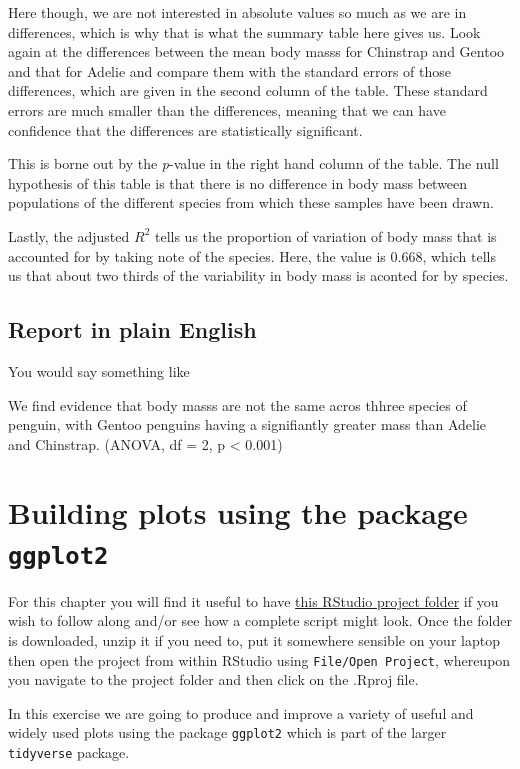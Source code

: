 \documentclass[
  letterpaper,
  DIV=11,
  numbers=noendperiod]{scrreprt}
\begin{document}
Here though, we are not interested in absolute values so much as we are
in differences, which is why that is what the summary table here gives
us. Look again at the differences between the mean body masss for
Chinstrap and Gentoo and that for Adelie and compare them with the
standard errors of those differences, which are given in the second
column of the table. These standard errors are much smaller than the
differences, meaning that we can have confidence that the differences
are statistically significant.

This is borne out by the \emph{p}-value in the right hand column of the
table. The null hypothesis of this table is that there is no difference
in body mass between populations of the different species from which
these samples have been drawn.

Lastly, the adjusted \(R^2\) tells us the proportion of variation of
body mass that is accounted for by taking note of the species. Here, the
value is 0.668, which tells us that about two thirds of the variability
in body mass is aconted for by species.

\section{Report in plain English}\label{report-in-plain-english}

You would say something like

We find evidence that body masss are not the same acros thhree species
of penguin, with Gentoo penguins having a signifiantly greater mass than
Adelie and Chinstrap. (ANOVA, df = 2, p \textless{} 0.001)

\chapter{\texorpdfstring{Building plots using the package
\texttt{ggplot2}}{Building plots using the package ggplot2}}\label{building-plots-using-the-package-ggplot2}

For this chapter you will find it useful to have
\href{https://github.com/mbh038/ggplot2/archive/refs/heads/main.zip}{this
RStudio project folder} if you wish to follow along and/or see how a
complete script might look. Once the folder is downloaded, unzip it if
you need to, put it somewhere sensible on your laptop then open the
project from within RStudio using \texttt{File/Open\ Project}, whereupon
you navigate to the project folder and then click on the .Rproj file.

In this exercise we are going to produce and improve a variety of useful
and widely used plots using the package \texttt{ggplot2} which is part
of the larger \texttt{tidyverse} package.
\end{document}
